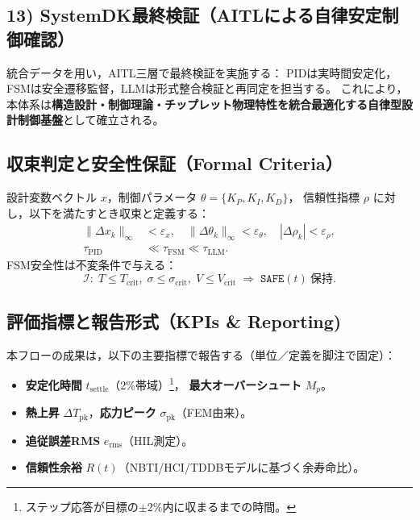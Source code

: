 \subsection{13) SystemDK最終検証（AITLによる自律安定制御確認）}
統合データを用い，AITL三層で最終検証を実施する：
PIDは実時間安定化，FSMは安全遷移監督，LLMは形式整合検証と再同定を担当する。
これにより，本体系は\textbf{構造設計・制御理論・チップレット物理特性を統合最適化する自律型設計制御基盤}として確立される。

\subsection*{収束判定と安全性保証（Formal Criteria）}
設計変数ベクトル $x$，制御パラメータ $\theta=\{K_P,K_I,K_D\}$，
信頼性指標 $\rho$ に対し，以下を満たすとき収束と定義する：
\begin{align}
\|\Delta x_k\|_\infty &< \varepsilon_x,\quad
\|\Delta \theta_k\|_\infty < \varepsilon_\theta,\quad
|\Delta \rho_k| < \varepsilon_\rho, \label{eq:conv}\\
\tau_{\mathrm{PID}} &\ll \tau_{\mathrm{FSM}} \ll \tau_{\mathrm{LLM}}. \label{eq:timescales}
\end{align}
FSM安全性は不変条件で与える：
\begin{equation}
\mathcal{I}:\; T \le T_{\mathrm{crit}},\;\sigma \le \sigma_{\mathrm{crit}},\;V \le V_{\mathrm{crit}}
\;\Rightarrow\; \texttt{SAFE}(t)\ \text{保持}. \label{eq:invariant}
\end{equation}

\subsection*{評価指標と報告形式（KPIs \& Reporting)}
本フローの成果は，以下の主要指標で報告する（単位／定義を脚注で固定）：
\begin{itemize}
  \item \textbf{安定化時間} $t_{\mathrm{settle}}$（2\%帯域）\footnote{ステップ応答が目標の$\pm2\%$内に収まるまでの時間。}，
        \textbf{最大オーバーシュート} $M_p$。
  \item \textbf{熱上昇} $\Delta T_{\mathrm{pk}}$，\textbf{応力ピーク} $\sigma_{\mathrm{pk}}$（FEM由来）。
  \item \textbf{追従誤差RMS} $e_{\mathrm{rms}}$（HIL測定）。
  \item \textbf{信頼性余裕} $R(t)$（NBTI/HCI/TDDBモデルに基づく余寿命比）。
\end{itemize}

